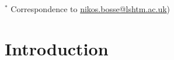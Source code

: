 \documentclass{article}
\begin{document}
\begin{abstract}
\end{abstract}

\bigskip

{\footnotesize $^*$ Correspondence to \url{nikos.bosse@lshtm.ac.uk})}



\newpage


\section{Introduction}
\end{document}

